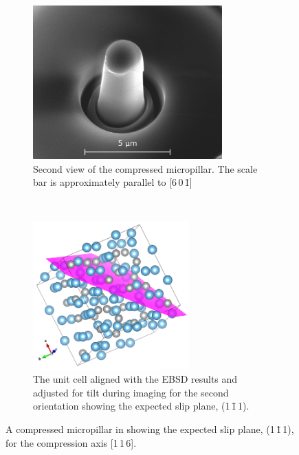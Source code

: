 \begin{figure}
\begin{subfigure}{0.45\textwidth}
\includegraphics[width=0.8\textwidth]{pillar_3_v2}
\caption{Second view of the compressed  micropillar. The scale bar is approximately parallel to [6\,0\,\={1}]}
\end{subfigure}
~
\begin{subfigure}{0.45\textwidth}
\centering
\includegraphics[width=0.66\textwidth]{Pillar_3_unit_cell_v2}
\caption{The unit cell aligned with the EBSD results and adjusted for tilt during imaging for the second orientation showing the expected slip plane, (1\,\={1}\,1).}
\end{subfigure}
\caption[A compressed micropillar of  showing the slip plane.]{A compressed micropillar in  showing the expected slip plane, (1\,\={1}\,1), for the compression axis [1\,1\,6].\label{fig:micropillar}}
\end{figure}


